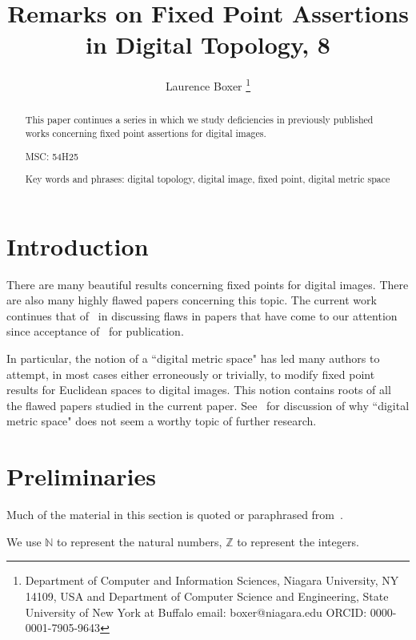 \documentclass{article}
\numberwithin{thm}{section}
\def\Z{{\mathbb Z}}
\def\N{{\mathbb N}}
\def\R{{\mathbb R}}
\begin{document}
\title{Remarks on Fixed Point Assertions in Digital Topology, 8}
\author{Laurence Boxer
\thanks{Department of Computer and Information Sciences, Niagara University, NY 14109, USA
and  \newline
Department of Computer Science and Engineering, State University of New York at Buffalo \newline
email: boxer@niagara.edu
\newline
ORCID: 0000-0001-7905-9643
}
}

\date{ }
\maketitle

\begin{abstract}
    This paper continues a series in which we study
    deficiencies in previously published works
    concerning fixed point assertions for digital images.

MSC: 54H25

Key words and phrases: digital topology, digital image,
fixed point, digital metric space
\end{abstract}

\section{Introduction}
There are many beautiful results concerning fixed points
for digital images. There are also many highly flawed
papers concerning this topic. The current work
continues that
of~\cite{BxSt19, Bx19, Bx19-3, Bx20, Bx22, BxBad6, BxBad7}
in discussing flaws in papers that have come to our
attention since acceptance of~\cite{BxBad7} for
publication.

In particular, the notion of
a ``digital metric space" has led many authors to attempt,
in most cases either erroneously or trivially, to modify fixed
point results for Euclidean spaces to digital images. 
This notion contains roots of all the
flawed papers studied in the current paper.
See~\cite{Bx20} for discussion of why ``digital metric space"
does not seem a worthy topic of further research.

\section{Preliminaries}
Much of the material in this section is quoted or
paraphrased from~\cite{Bx20}.

We use $\N$ to represent the natural numbers,
$\Z$ to represent the integers. 
\end{document}
